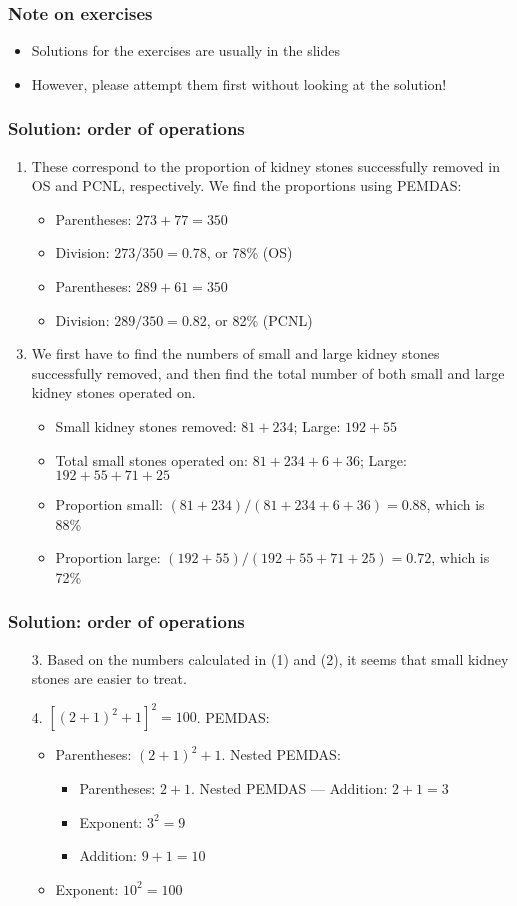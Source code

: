 \documentclass[11pt]{beamer}
\newcommand{\myframe}[1]{\begin{frame} \frametitle{#1}}
\begin{document}
\myframe{Note on exercises}
\begin{itemize}
\item Solutions for the exercises are usually in the slides
\item[]
\item However, please attempt them first without looking at the solution!
\end{itemize}
\end{frame}

\myframe{Solution: order of operations}
\begin{enumerate}
\item These correspond to the proportion of kidney stones successfully removed in OS and PCNL, respectively. We find the proportions using PEMDAS:
\begin{itemize}
\item Parentheses: $273+77 = 350$
\item Division: $273/350 = 0.78$, or 78\% (OS)
\item Parentheses: $289+61 = 350$
\item Division: $289/350 = 0.82$, or 82\% (PCNL)
\end{itemize}
\item[]
\item We first have to find the numbers of small and large kidney stones successfully removed, and then find the total number of both small and large kidney stones operated on.
\begin{itemize}
\item Small kidney stones removed: $81+234$; Large: $192+55$
\item Total small stones operated on: $81+234+6+36$; Large: $192+55+71+25$
\item Proportion small: $(81+234)/(81+234+6+36) = 0.88$, which is 88\%
\item Proportion large: $(192+55)/(192+55+71+25) = 0.72$, which is 72\%
\end{itemize}
\end{enumerate}
\end{frame}

\myframe{Solution: order of operations}
\begin{enumerate}
\item[3.] Based on the numbers calculated in (1) and (2), it seems that small kidney stones are easier to treat.
\item[]
\item[4.] $[(2+1)^2 + 1]^2 = 100$. PEMDAS:
\begin{itemize}
\item Parentheses: $(2 + 1)^2 + 1$. Nested PEMDAS:
\begin{itemize}
\item Parentheses: $2 + 1$. Nested PEMDAS --- Addition: $2 + 1 = 3$
\item Exponent: $3^2 = 9$ 
\item Addition: $9 + 1 = 10$
\end{itemize}
\item Exponent: $10^2 = 100$
\end{itemize}
\end{enumerate}
\end{frame}
\end{document}
